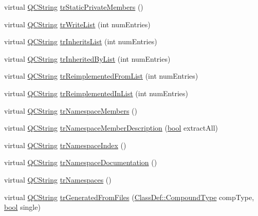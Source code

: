 \begin{DoxyCompactItemize}
\item 
virtual \hyperlink{class_q_c_string}{Q\+C\+String} \hyperlink{class_translator_chinesetraditional_ad4bcfbd62ef5ce7179c8580d3be556d5}{tr\+Static\+Private\+Members} ()
\item 
virtual \hyperlink{class_q_c_string}{Q\+C\+String} \hyperlink{class_translator_chinesetraditional_a173a9add6c2a074ea0b69e02c58ab105}{tr\+Write\+List} (int num\+Entries)
\item 
virtual \hyperlink{class_q_c_string}{Q\+C\+String} \hyperlink{class_translator_chinesetraditional_a87374f3d1f0381391d6bc2841281353f}{tr\+Inherits\+List} (int num\+Entries)
\item 
virtual \hyperlink{class_q_c_string}{Q\+C\+String} \hyperlink{class_translator_chinesetraditional_a39a3b2bb06ce928b00ccd3425cb51015}{tr\+Inherited\+By\+List} (int num\+Entries)
\item 
virtual \hyperlink{class_q_c_string}{Q\+C\+String} \hyperlink{class_translator_chinesetraditional_a4123a9a2bd28068e475392efd4651c42}{tr\+Reimplemented\+From\+List} (int num\+Entries)
\item 
virtual \hyperlink{class_q_c_string}{Q\+C\+String} \hyperlink{class_translator_chinesetraditional_aca576368f45551caeec96ea9d69ec408}{tr\+Reimplemented\+In\+List} (int num\+Entries)
\item 
virtual \hyperlink{class_q_c_string}{Q\+C\+String} \hyperlink{class_translator_chinesetraditional_a3aec65a28c2b177db121ad1645413e3b}{tr\+Namespace\+Members} ()
\item 
virtual \hyperlink{class_q_c_string}{Q\+C\+String} \hyperlink{class_translator_chinesetraditional_a171a9f55c053e186ccbdeb618926078c}{tr\+Namespace\+Member\+Description} (\hyperlink{qglobal_8h_a1062901a7428fdd9c7f180f5e01ea056}{bool} extract\+All)
\item 
virtual \hyperlink{class_q_c_string}{Q\+C\+String} \hyperlink{class_translator_chinesetraditional_a29d1791d96691ceb1290847ff865ca83}{tr\+Namespace\+Index} ()
\item 
virtual \hyperlink{class_q_c_string}{Q\+C\+String} \hyperlink{class_translator_chinesetraditional_a8921d97e025593ea1bf75e5154f184e8}{tr\+Namespace\+Documentation} ()
\item 
virtual \hyperlink{class_q_c_string}{Q\+C\+String} \hyperlink{class_translator_chinesetraditional_abbf6cde3ca2bb82a800469df5956a5fb}{tr\+Namespaces} ()
\item 
virtual \hyperlink{class_q_c_string}{Q\+C\+String} \hyperlink{class_translator_chinesetraditional_ace05defa8a32689be41d1c8296f4c0a1}{tr\+Generated\+From\+Files} (\hyperlink{class_class_def_ae70cf86d35fe954a94c566fbcfc87939}{Class\+Def\+::\+Compound\+Type} comp\+Type, \hyperlink{qglobal_8h_a1062901a7428fdd9c7f180f5e01ea056}{bool} single)

\end{DoxyCompactItemize}
